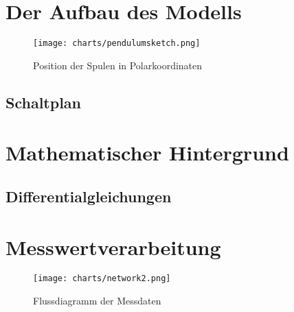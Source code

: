\documentclass[a4paper]{article}
\title{\mytitle}
\author{\myauthor}
\begin{document}
\maketitle
\begin{abstract}
In unserem Projekt beschäftigen wir uns mit dem Verhalten von chaotischen Doppelpendeln. Wir wollen aus der aktuellen Bewegung eines Doppelpendels den weiteren Bewegungsablauf in einem kurzen Zeitintervall extrapolieren und dann versuchen, diese Bewegung zu beeinflussen.

Hierzu wollen wir zunächst ein Doppelpendel konstruieren, bei dem Daten über den aktuellen Bewegungszustand erfasst werden können. Diese Daten sollen in Echtzeit von einem Computer ausgewertet werden, um laufend eine Prognose an die Messwerte anzupassen. Anhand dieser Prognose soll dann entschieden werden, ob das Pendel eine unerwünschte Bewegung durchführen wird, und wenn nötig, soll mithilfe mehrerer Spulen eine korrigierende magnetische Kraft erzeugt werden. Es könnte zum Beispiel erwünscht sein, einen Überschlag zu vermeiden.
\end{abstract}

\newpage

\section{Der Aufbau des Modells}
\begin{figure}
  \texttt{[image: charts/pendulumsketch.png]}
  \caption{Position der Spulen in Polarkoordinaten}
  \label{fig:pendulumsketch}
\end{figure}
\subsection{Schaltplan}

\section{Mathematischer Hintergrund}
\subsection{Differentialgleichungen}

\section{Messwertverarbeitung}
\begin{figure}
  \texttt{[image: charts/network2.png]}
  \caption{Flussdiagramm der Messdaten}
  \label{fig:network}
\end{figure}

%
\end{document}
